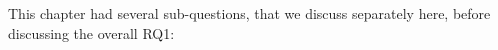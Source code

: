 

This chapter had several sub-questions, that we discuss separately here, before discussing the overall RQ1:

